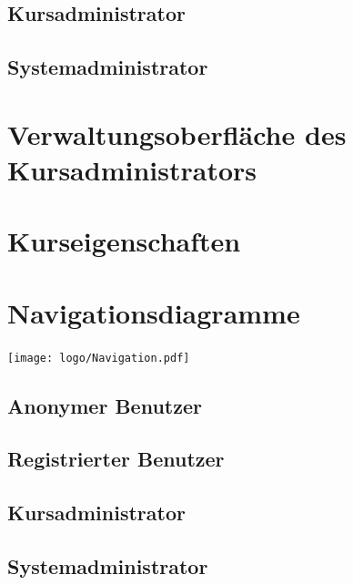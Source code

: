\documentclass[a4paper]{scrreprt}
\begin{document}
       	
       	    
    \subsection{Kursadministrator}
        
        

    \subsection{Systemadministrator}
        
        
            
   
    
    \section{Verwaltungsoberfläche des Kursadministrators}
    
   
       
    
    \section{Kurseigenschaften}
    
    
       
    
    
    \section{Navigationsdiagramme}
    \texttt{[image: logo/Navigation.pdf]}
        \subsection{Anonymer Benutzer}
            
            
            
        \subsection{Registrierter Benutzer}
             
            
            
        \subsection{Kursadministrator}
            
             
            
        \subsection{Systemadministrator}
           
\end{document}
